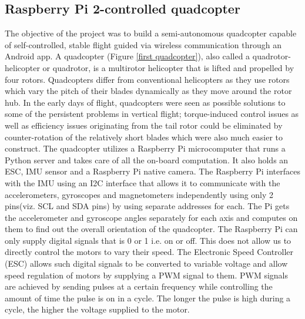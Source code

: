 \subsection{Raspberry Pi 2-controlled quadcopter}
The objective of the project was to build a semi-autonomous quadcopter capable of self-controlled, stable flight guided via wireless communication through an Android app. 
A quadcopter (Figure \ref{first quadcopter}), also called a quadrotor-helicopter or quadrotor, is a multirotor helicopter that is lifted and propelled by four rotors. Quadcopters differ from conventional helicopters as they use rotors which vary the pitch of their blades dynamically as they move around the rotor hub. 
\newline \newline
In the early days of flight, quadcopters were seen as possible solutions to some of the persistent problems in vertical flight; torque-induced control issues as well as efficiency issues originating from the tail rotor could be eliminated by counter-rotation of the relatively short blades which were also much easier to construct.
\newline
\newline
The quadcopter utilizes a Raspberry Pi microcomputer that runs a Python server and takes care of all the on-board computation. It also holds an ESC, IMU sensor and a Raspberry Pi native camera.
\newline \newline
 The Raspberry Pi interfaces with the IMU using an I2C interface that allows it to communicate with the accelerometers, gyroscopes and magnetometers independently using only 2 pins(viz. SCL and SDA pins) by using separate addresses for each. The Pi gets the accelerometer and gyroscope angles separately for each axis and computes on them to find out the overall orientation of the quadcopter.
\newline
\newline
The Raspberry Pi can only supply digital signals that is 0 or 1 i.e. on or off. This does not allow us to directly control the motors to vary their speed. The Electronic Speed Controller (ESC) allows such digital signals to be converted to variable voltage and allow speed regulation of motors by supplying a PWM signal to them. PWM signals are achieved by sending pulses at a certain frequency while controlling the amount of time the pulse is on in a cycle. The longer the pulse is high during a cycle, the higher the voltage supplied to the motor. 
\newline
